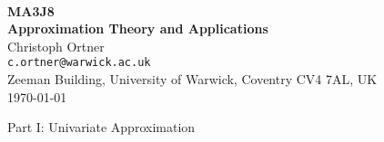 \documentclass[a4paper, 11pt, reqno]{article}
\numberwithin{equation}{section}
\numberwithin{theorem}{section}
\begin{document}
\begin{center}
  \hfill \\[4cm]
  {\Large \bf MA3J8} \\[1mm]
  {\Large \bf Approximation Theory and Applications} \\[4mm]
  {\large Christoph Ortner} \\
  {\small \tt c.ortner@warwick.ac.uk} \\
  {\small Zeeman Building, University of Warwick, Coventry CV4 7AL, UK} \\[4mm]
  {\today}
\end{center}

\clearpage
\quad
\clearpage

\tableofcontents

\clearpage



\clearpage

\vspace{5cm}

{\huge Part I: Univariate Approximation}

\clearpage


\clearpage


\clearpage


\clearpage


\clearpage






\end{document}
